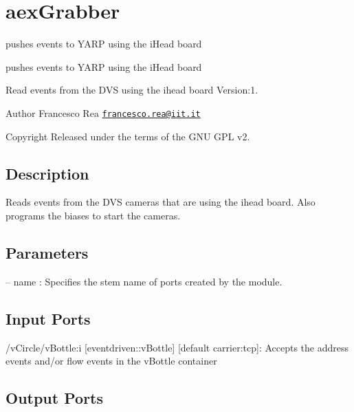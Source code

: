 \hypertarget{group__aexGrabber}{}\section{aex\+Grabber}
\label{group__aexGrabber}


pushes events to Y\+A\+RP using the i\+Head board  


pushes events to Y\+A\+RP using the i\+Head board 

Read events from the D\+VS using the ihead board Version\+:1. \begin{DoxyAuthor}{Author}
Francesco Rea \href{mailto:francesco.rea@iit.it}{\tt francesco.\+rea@iit.\+it} ~\newline
 
\end{DoxyAuthor}
\begin{DoxyCopyright}{Copyright}
Released under the terms of the G\+NU G\+PL v2. 
\end{DoxyCopyright}
\hypertarget{group__vUndistortCam_intro_sec}{}\subsection{Description}\label{group__vUndistortCam_intro_sec}
Reads events from the D\+VS cameras that are using the ihead board. Also programs the biases to start the cameras.\hypertarget{group__vUndistortCam_parameters_sec}{}\subsection{Parameters}\label{group__vUndistortCam_parameters_sec}

\begin{DoxyItemize}
\item -- name \+: Specifies the stem name of ports created by the module. 
\end{DoxyItemize}\hypertarget{group__vUndistortCam_inputports_sec}{}\subsection{Input Ports}\label{group__vUndistortCam_inputports_sec}

\begin{DoxyItemize}
\item /v\+Circle/v\+Bottle\+:i \mbox{[}eventdriven\+::v\+Bottle\mbox{]} \mbox{[}default carrier\+:tcp\mbox{]}\+: Accepts the address events and/or flow events in the v\+Bottle container
\end{DoxyItemize}\hypertarget{group__vUndistortCam_outputports_sec}{}\subsection{Output Ports}\label{group__vUndistortCam_outputports_sec}

